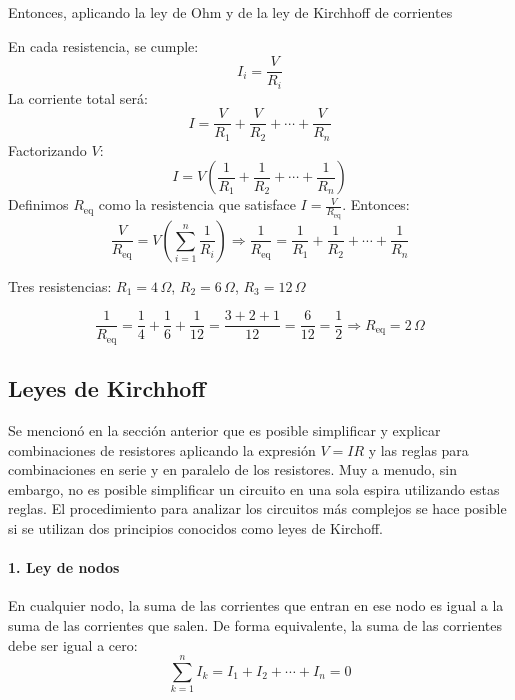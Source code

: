 Entonces, aplicando la ley de Ohm y de la ley de Kirchhoff de corrientes

En cada resistencia, se cumple:
\[
  I_i = \frac{V}{R_i}
\]
La corriente total será:
\[
  I = \frac{V}{R_1} + \frac{V}{R_2} + \cdots + \frac{V}{R_n}
\]
Factorizando \( V \):
\[
  I = V \left( \frac{1}{R_1} + \frac{1}{R_2} + \cdots + \frac{1}{R_n} \right)
\]
Definimos \( R_{\text{eq}} \) como la resistencia que satisface \( I = \frac{V}{R_{\text{eq}}} \). Entonces:
\[
  \frac{V}{R_{\text{eq}}} = V \left( \sum_{i=1}^{n} \frac{1}{R_i} \right)
  \Rightarrow \boxed{\frac{1}{R_{\text{eq}}} = \frac{1}{R_1} + \frac{1}{R_2} + \cdots + \frac{1}{R_n}}
\]

\begin{example}
Tres resistencias: \( R_1 = 4 \, \Omega \), \( R_2 = 6 \, \Omega \), \( R_3 = 12 \, \Omega \)

\[
  \frac{1}{R_{\text{eq}}} = \frac{1}{4} + \frac{1}{6} + \frac{1}{12} = \frac{3 + 2 + 1}{12} = \frac{6}{12} = \frac{1}{2}
  \Rightarrow R_{\text{eq}} = 2 \, \Omega
\]
\end{example}

\subsection{Leyes de Kirchhoff}

Se mencionó en la sección anterior que es posible simplificar y explicar combinaciones de resistores aplicando la expresión \(V=IR\) y las reglas para combinaciones en serie y en paralelo de los resistores. Muy a menudo, sin embargo, no es posible simplificar un circuito en una sola espira utilizando estas reglas. El procedimiento para analizar los circuitos más complejos se hace posible si se utilizan dos principios conocidos como leyes de Kirchoff.

\begin{marginfigure}
  \centering
  \caption{El punto \(A\) es un nodo de un circuito.}
  \label{fig_1_kirchoff}
\end{marginfigure}
\paragraph{1. Ley de nodos} En cualquier nodo, la suma de las corrientes que entran en ese nodo es igual a la suma de las corrientes que salen. De forma equivalente, la suma de las corrientes debe ser igual a cero:
\[
  \sum_{k=1}^n I_k = I_1 + I_2 + \cdots + I_n = 0
\]

